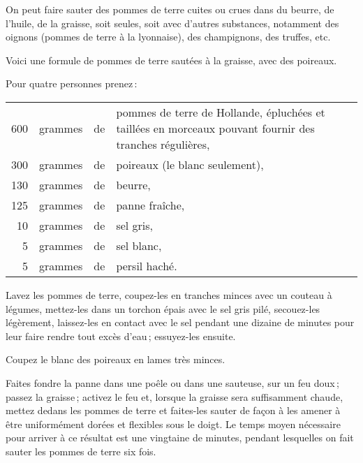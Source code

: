 On peut faire sauter des pommes de terre cuites ou crues dans du beurre, de
l'huile, de la graisse, soit seules, soit avec d'autres substances, notamment des
oignons (pommes de terre à la lyonnaise), des champignons, des truffes, etc.

Voici une formule de pommes de terre sautées à la graisse, avec des poireaux.

\medskip

Pour quatre personnes prenez :

\footnotesize
\begin{longtable}{rrrp{16em}}
    600 & grammes & de & pommes de terre de Hollande, épluchées et taillées
                         en morceaux pouvant fournir des tranches régulières,                             \\
    300 & grammes & de & poireaux (le blanc seulement),                                                   \\
    130 & grammes & de & beurre,                                                                          \\
    125 & grammes & de & panne fraîche,                                                                   \\
     10 & grammes & de & sel gris,                                                                        \\
      5 & grammes & de & sel blanc,                                                                       \\
      5 & grammes & de & persil haché.                                                                    \\
\end{longtable}
\normalsize

Lavez les pommes de terre, coupez-les en tranches minces avec un couteau
à légumes, mettez-les dans un torchon épais avec le sel gris pilé, secouez-les
légèrement, laissez-les en contact avec le sel pendant une dizaine de minutes
pour leur faire rendre tout excès d'eau ; essuyez-les ensuite.

Coupez le blanc des poireaux en lames très minces.

Faites fondre la panne dans une poêle ou dans une sauteuse, sur un feu doux ;
passez la graisse ; activez le feu et, lorsque la graisse sera suffisamment
chaude, mettez dedans les pommes de terre et faites-les sauter de façon à les
amener à être uniformément dorées et flexibles sous le doigt. Le temps moyen
nécessaire pour arriver à ce résultat est une vingtaine de minutes, pendant
lesquelles on fait sauter les pommes de terre six fois.


